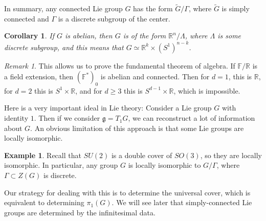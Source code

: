 \documentclass[leqno, openany]{memoir}
\newtheorem{cor}[thm]{Corollary}
\theoremstyle{definition}
\newtheorem{exm}[thm]{Example}
\theoremstyle{remark}
\newtheorem{rmk}[thm]{Remark}
\theoremstyle{plain}
\theoremstyle{definition}
\theoremstyle{remark}
\newcommand{\F}{\mathbb{F}}
\newcommand{\R}{\mathbb{R}}
\newcommand{\mf}[1]{\mathfrak{#1}}
\newcommand{\wtl}[1]{\widetilde{#1}}
\begin{document}
In summary, any connected Lie group $G$ has the form $\wtl{G} / \Gamma$, where
$\wtl{G}$ is simply connected and $\Gamma$ is a discrete subgroup of the
center.

\begin{cor} If $G$ is abelian, then $G$ is of the form $\R^n / \Lambda$, where
$\Lambda$ is some discrete subgroup, and this means that $G \simeq \R^k \times
(S^1)^{n-k}$.  \end{cor}

\begin{rmk} This allows us to prove the fundamental theorem of algebra. If
    $\F/\R$ is a field extension, then $( \F^* )_0$ is abelian and connected.
    Then for $d = 1$, this is $\R$, for $d = 2$ this is $S^1 \times \R$, and
    for $d \geq 3$ this is $S^{d-1} \times \R$, which is impossible.  \end{rmk}


Here is a very important ideal in Lie theory: Consider a Lie group $G$ with
identity $1$. Then if we consider $\mf{g} = T_1 G$, we can reconstruct a lot of
information about $G$. An obvious limitation of this approach is that some Lie
groups are locally isomorphic.

\begin{exm} Recall that $SU(2)$ is a double cover of $SO(3)$, so they are
locally isomorphic. In particular, any group $G$ is locally isomorphic to $G /
\Gamma$, where $\Gamma \subset Z(G)$ is discrete.  \end{exm}

Our strategy for dealing with this is to determine the universal cover, which
is equivalent to determining $\pi_1(G)$. We will see later that
simply-connected Lie groups are determined by the infinitesimal data.
\end{document}

